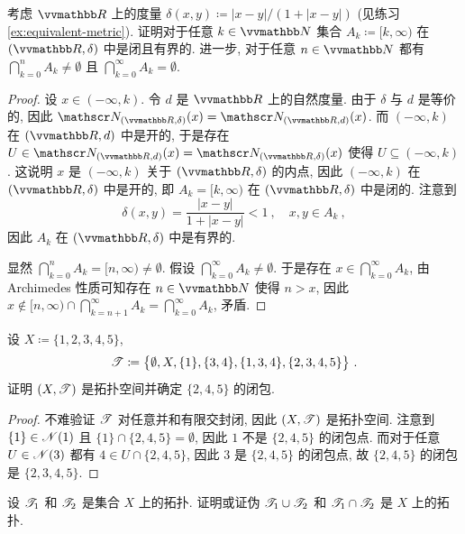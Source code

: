 \begin{exercise}
    考虑 \(\R\) 上的度量 \(\delta(x, y) \coloneqq |x - y| \big/ (1 + |x - y|)\) (见练习 \ref{ex:equivalent-metric}). 证明对于任意 \(k \in \N\) 集合 \(A_k \coloneqq [k, \infty)\) 在 \((\R, \delta)\) 中是闭且有界的. 进一步, 对于任意 \(n \in \N\) 都有 \(\bigcap_{k = 0}^n A_k \neq \emptyset\) 且 \(\bigcap_{k = 0}^\infty A_k = \emptyset\).
\end{exercise}

\begin{proof}
    设 \(x \in (- \infty, k)\). 令 \(d\) 是 \(\R\) 上的自然度量. 由于 \(\delta\) 与 \(d\) 是等价的, 因此 \(\nbr_{(\R, \delta)}(x) = \nbr_{(\R, d)}(x)\). 而 \((- \infty, k)\) 在 \((\R, d)\) 中是开的, 于是存在 \(U \in \nbr_{(\R, d)}(x) = \nbr_{(\R, \delta)}(x)\) 使得 \(U \subseteq (- \infty, k)\). 这说明 \(x\) 是 \((- \infty, k)\) 关于 \((\R, \delta)\) 的内点, 因此 \((- \infty, k)\) 在 \((\R, \delta)\) 中是开的, 即 \(A_k = [k, \infty)\) 在 \((\R, \delta)\) 中是闭的. 注意到
    \[
        \delta(x, y) = \frac{|x - y|}{1 + |x - y|} < 1\ ,\quad x, y \in A_k\ ,
    \]
    因此 \(A_k\) 在 \((\R, \delta)\) 中是有界的.

    显然 \(\bigcap_{k = 0}^n A_k = [n, \infty) \neq \emptyset\). 假设 \(\bigcap_{k = 0}^\infty A_k \neq \emptyset\). 于是存在 \(x \in \bigcap_{k = 0}^\infty A_k\), 由 Archimedes 性质可知存在 \(n \in \N\) 使得 \(n > x\), 因此 \(x \notin [n, \infty) \cap \bigcap_{k = n + 1}^\infty A_k = \bigcap_{k = 0}^\infty A_k\), 矛盾.
\end{proof}

\begin{exercise}\label{ex:topological-space-which-not-hausdorff}
    设 \(X \coloneqq \{1, 2, 3, 4, 5\}\),
    \[
        \mathscr T \coloneqq \bigl\{ \emptyset, X, \{1\}, \{3, 4\}, \{1, 3, 4\}, \{2, 3, 4, 5\} \bigr\}\ .
    \]
    证明 \((X, \mathscr T)\) 是拓扑空间并确定 \(\{2, 4, 5\}\) 的闭包.
\end{exercise}

\begin{proof}
    不难验证 \(\mathscr T\) 对任意并和有限交封闭, 因此 \((X, \mathscr T)\) 是拓扑空间. 注意到 \(\{1\} \in \mathscr N(1)\) 且 \(\{1\} \cap \{2, 4, 5\} = \emptyset\), 因此 \(1\) 不是 \(\{2, 4, 5\}\) 的闭包点. 而对于任意 \(U \in \mathscr N(3)\) 都有 \(4 \in U \cap \{2, 4, 5\}\), 因此 \(3\) 是 \(\{2, 4, 5\}\) 的闭包点, 故 \(\{2, 4, 5\}\) 的闭包是 \(\{2, 3, 4, 5\}\).
\end{proof}

\begin{exercise}
    设 \(\mathscr T_1\) 和 \(\mathscr T_2\) 是集合 \(X\) 上的拓扑. 证明或证伪 \(\mathscr T_1 \cup \mathscr T_2\) 和 \(\mathscr T_1 \cap \mathscr T_2\) 是 \(X\) 上的拓扑.
\end{exercise}

